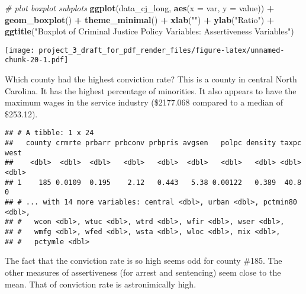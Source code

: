 \documentclass[]{article}
\newenvironment{Shaded}{\begin{snugshade}}{\end{snugshade}}
\newcommand{\CommentTok}[1]{\textcolor[rgb]{0.56,0.35,0.01}{\textit{#1}}}
\newcommand{\DataTypeTok}[1]{\textcolor[rgb]{0.13,0.29,0.53}{#1}}
\newcommand{\KeywordTok}[1]{\textcolor[rgb]{0.13,0.29,0.53}{\textbf{#1}}}
\newcommand{\NormalTok}[1]{#1}
\newcommand{\OperatorTok}[1]{\textcolor[rgb]{0.81,0.36,0.00}{\textbf{#1}}}
\newcommand{\StringTok}[1]{\textcolor[rgb]{0.31,0.60,0.02}{#1}}
\begin{document}
\begin{Shaded}
\begin{Highlighting}[]
\CommentTok{# plot boxplot subplots }
\KeywordTok{ggplot}\NormalTok{(data_cj_long, }\KeywordTok{aes}\NormalTok{(}\DataTypeTok{x =}\NormalTok{ var, }\DataTypeTok{y =}\NormalTok{ value)) }\OperatorTok{+}
\StringTok{  }\KeywordTok{geom_boxplot}\NormalTok{() }\OperatorTok{+}
\StringTok{  }\KeywordTok{theme_minimal}\NormalTok{() }\OperatorTok{+}
\StringTok{  }\KeywordTok{xlab}\NormalTok{(}\StringTok{""}\NormalTok{) }\OperatorTok{+}
\StringTok{  }\KeywordTok{ylab}\NormalTok{(}\StringTok{"Ratio"}\NormalTok{) }\OperatorTok{+}\StringTok{ }
\StringTok{  }\KeywordTok{ggtitle}\NormalTok{(}\StringTok{"Boxplot of Criminal Justice Policy Variables: Assertiveness Variables"}\NormalTok{)}
\end{Highlighting}
\end{Shaded}

\texttt{[image: project\_3\_draft\_for\_pdf\_render\_files/figure-latex/unnamed-chunk-20-1.pdf]}

Which county had the highest conviction rate? This is a county in
central North Carolina. It has the highest percentage of minorities. It
also appears to have the maximum wages in the service industry
(\$2177.068 compared to a median of \$253.12).

\begin{Shaded}
\end{Shaded}

\begin{verbatim}
## # A tibble: 1 x 24
##   county crmrte prbarr prbconv prbpris avgsen   polpc density taxpc  west
##    <dbl>  <dbl>  <dbl>   <dbl>   <dbl>  <dbl>   <dbl>   <dbl> <dbl> <dbl>
## 1    185 0.0109  0.195    2.12   0.443   5.38 0.00122   0.389  40.8     0
## # ... with 14 more variables: central <dbl>, urban <dbl>, pctmin80 <dbl>,
## #   wcon <dbl>, wtuc <dbl>, wtrd <dbl>, wfir <dbl>, wser <dbl>,
## #   wmfg <dbl>, wfed <dbl>, wsta <dbl>, wloc <dbl>, mix <dbl>,
## #   pctymle <dbl>
\end{verbatim}

The fact that the conviction rate is so high seems odd for county \#185.
The other measures of assertiveness (for arrest and sentencing) seem
close to the mean. That of conviction rate is astronimically high.
\end{document}
